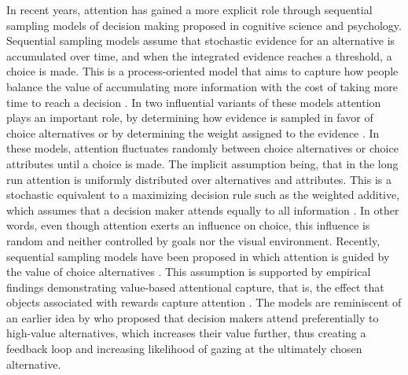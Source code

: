 In recent years, attention has gained a more explicit role through sequential sampling models of decision making proposed in cognitive science and psychology. Sequential sampling models assume that stochastic evidence for an alternative is accumulated over time, and when the integrated evidence reaches a threshold, a choice is made. This is a process-oriented model that aims to capture how people balance the value of accumulating more information with the cost of taking more time to reach a decision \citep{forstmann2016}. In two influential variants of these models attention plays an important role, by determining how evidence is sampled in favor of choice alternatives \citep{busemeyer1992} or by determining the weight assigned to the evidence \citep{krajbich2010a, thomas2019}. In these models, attention fluctuates randomly between choice alternatives or choice attributes until a choice is made. The implicit assumption being, that in the long run attention is uniformly distributed over alternatives and attributes. This is a stochastic equivalent to a maximizing decision rule such as the weighted additive, which assumes that a decision maker attends equally to all information \citep{gloeckner2011a, payne1988}. In other words, even though attention exerts an influence on choice, this influence is random and neither controlled by goals nor the visual environment. Recently, sequential sampling models have been proposed in which attention is guided by the value of choice alternatives \citep{callaway2019a, gluth2018, gluth2020}. This assumption is supported by empirical findings demonstrating value-based attentional capture, that is, the effect that objects associated with rewards capture attention \citep{lepelley2015}. The models are reminiscent of an earlier idea by \cite{shimojo2003a} who proposed that decision makers attend preferentially to high-value alternatives, which increases their value further, thus creating a feedback loop and increasing likelihood of gazing at the ultimately chosen alternative.

